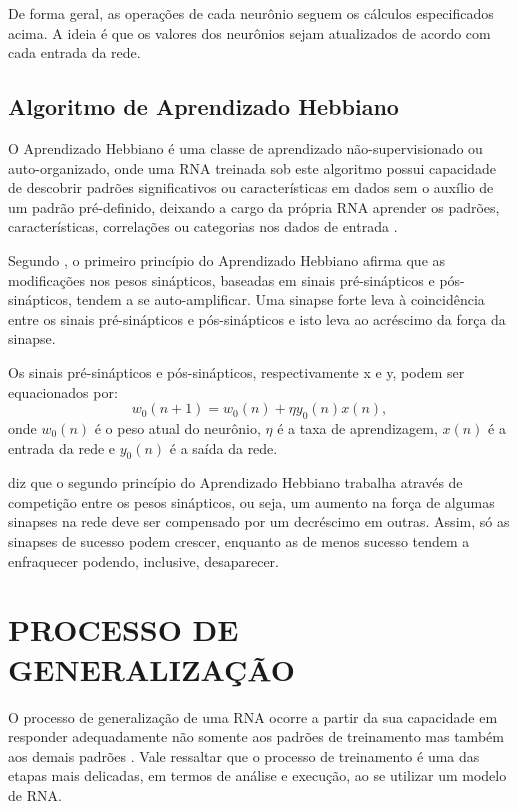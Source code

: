 De forma geral, as operações de cada neurônio seguem os cálculos especificados acima. A ideia é que os valores dos neurônios sejam atualizados de acordo com cada entrada da rede. 

\subsection{Algoritmo de Aprendizado Hebbiano}
O Aprendizado Hebbiano é uma classe de aprendizado não-supervisionado ou auto-organizado, onde uma RNA treinada sob este algoritmo possui capacidade de descobrir padrões significativos ou características em dados sem o auxílio de um padrão pré-definido, deixando a cargo da própria RNA aprender os padrões, características, correlações ou categorias nos dados de entrada \cite{castro}.

Segundo , o primeiro princípio do Aprendizado Hebbiano afirma que as modificações nos pesos sinápticos, baseadas em sinais pré-sinápticos e pós-sinápticos, tendem a se auto-amplificar. Uma sinapse forte leva à coincidência entre os sinais pré-sinápticos e pós-sinápticos e isto leva ao acréscimo da força da sinapse.

Os sinais pré-sinápticos e pós-sinápticos, respectivamente x e y, podem ser equacionados por:
\begin{equation}\label{eq:hebbiano}
w_{0} (n + 1) = w_{0}(n)+ \eta y_0(n)x(n),
\end{equation}
onde $w_{0}(n)$ é o peso atual do neurônio, $\eta$ é a taxa de aprendizagem, $x(n)$ é a entrada da rede e $y_0(n)$ é a saída da rede.

 diz que o segundo princípio do Aprendizado Hebbiano trabalha através de competição entre os pesos sinápticos, ou seja, um aumento na força de algumas sinapses na rede deve ser compensado por um decréscimo em outras. Assim, só as sinapses de sucesso podem crescer, enquanto as de menos sucesso tendem a enfraquecer podendo, inclusive, desaparecer.

\section{PROCESSO DE GENERALIZAÇÃO}\label{rna-generalização}
O processo de generalização de uma RNA ocorre a partir da sua capacidade em responder adequadamente não somente aos padrões de treinamento mas também aos demais padrões \cite{medeiros}. Vale ressaltar que o processo de treinamento é uma das etapas mais delicadas, em termos de análise e execução, ao se utilizar um modelo de RNA.

